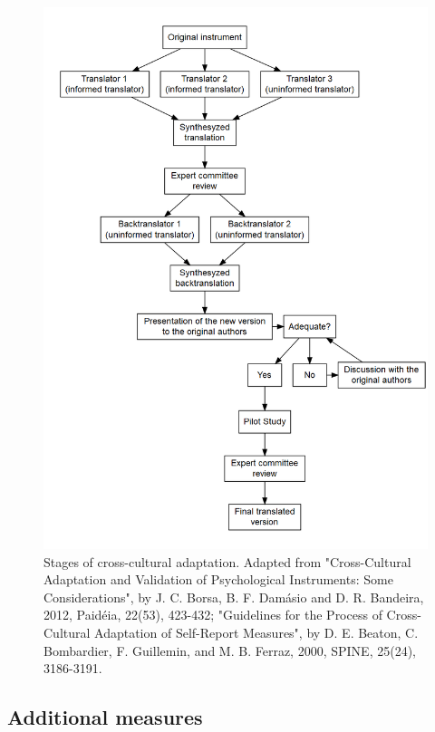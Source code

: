 \documentclass[
  ,doc,11pt, twoside,floatsintext]{apa6}
\begin{document}
\begin{figure}

{\centering \includegraphics{main_files/figure-latex/diag-1} 

}

\caption{Stages of cross-cultural adaptation. Adapted from "Cross-Cultural Adaptation and Validation of Psychological Instruments: Some Considerations", by J. C. Borsa, B. F. Damásio and D. R. Bandeira, 2012, Paidéia, 22(53), 423-432; "Guidelines for the Process of Cross-Cultural Adaptation of Self-Report Measures", by D. E. Beaton, C. Bombardier, F. Guillemin, and M. B. Ferraz, 2000, SPINE, 25(24), 3186-3191.}\label{fig:diag}
\end{figure}

\hypertarget{additional-measures}{%
\subsection{Additional measures}\label{additional-measures}}
\end{document}
